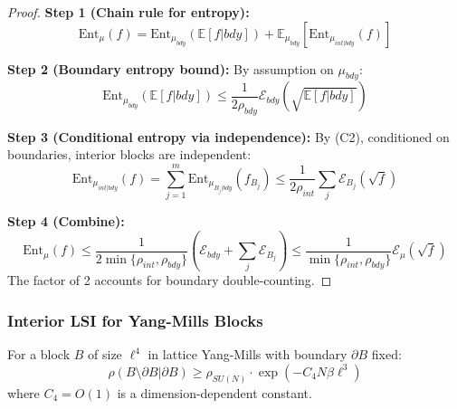 \begin{proof}
\textbf{Step 1 (Chain rule for entropy):}
\begin{equation}
\mathrm{Ent}_\mu(f) = \mathrm{Ent}_{\mu_{bdy}}(\mathbb{E}[f|bdy]) + \mathbb{E}_{\mu_{bdy}}[\mathrm{Ent}_{\mu_{int|bdy}}(f)]
\end{equation}

\textbf{Step 2 (Boundary entropy bound):}
By assumption on $\mu_{bdy}$:
\begin{equation}
\mathrm{Ent}_{\mu_{bdy}}(\mathbb{E}[f|bdy]) \leq \frac{1}{2\rho_{bdy}} \mathcal{E}_{bdy}(\sqrt{\mathbb{E}[f|bdy]})
\end{equation}

\textbf{Step 3 (Conditional entropy via independence):}
By (C2), conditioned on boundaries, interior blocks are independent:
\begin{equation}
\mathrm{Ent}_{\mu_{int|bdy}}(f) = \sum_{j=1}^m \mathrm{Ent}_{\mu_{B_j|bdy}}(f_{B_j}) \leq \frac{1}{2\rho_{int}} \sum_j \mathcal{E}_{B_j}(\sqrt{f})
\end{equation}

\textbf{Step 4 (Combine):}
\begin{equation}
\mathrm{Ent}_\mu(f) \leq \frac{1}{2\min\{\rho_{int}, \rho_{bdy}\}} \left(\mathcal{E}_{bdy} + \sum_j \mathcal{E}_{B_j}\right) \leq \frac{1}{\min\{\rho_{int}, \rho_{bdy}\}} \mathcal{E}_\mu(\sqrt{f})
\end{equation}
The factor of 2 accounts for boundary double-counting.
\end{proof}

\subsubsection{Interior LSI for Yang-Mills Blocks}

\begin{theorem}
\label{thm:interior_lsi}
For a block $B$ of size $\ell^4$ in lattice Yang-Mills with boundary $\partial B$ fixed:
\begin{equation}
\rho(B \setminus \partial B | \partial B) \geq \rho_{SU(N)} \cdot \exp\left(-C_4 N \beta \ell^3\right)
\end{equation}
where $C_4 = O(1)$ is a dimension-dependent constant.
\end{theorem}

